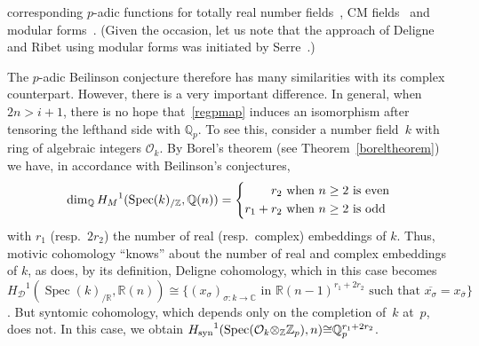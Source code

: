\documentclass{amsart}
\begin{document}
corresponding {$p$-adic{\futurelet{}}} functions for totally real number fields~\cite{Bar78,Cas-Nog79,Del-Rib},
CM fields~\cite{Kat76,Kat78} and modular forms~\cite{MTT86}.
(Given the occasion, let us note that the approach of Deligne and Ribet using modular forms was
initiated by Serre~\cite{Ser73}.)

The $p$-adic Beilinson conjecture therefore has many
similarities with its complex counterpart. However, there is a very
important difference. In general, when $  2n>i+1 $, there is no hope that~\eqref{regpmap}
induces an isomorphism after tensoring the lefthand side with ${\mathbb Q}_p$. 
To see this, consider a number field~$k$ with ring of algebraic integers $ {{\mathcal O}_k} $.
By Borel's theorem (see Theorem~\ref{boreltheorem}) we have,
in accordance with Beilinson's conjectures,
\begin{equation*}
  \dim_{\mathbb Q} {H_M}^1({\operatorname{Spec}}(k)_{/{\mathbb Z}},{\mathbb Q}(n))=
\left\{ 
\begin{aligned}
      r_2 & \text{ when $ n \ge 2 $ is even }
\\
r_1 + r_2 & \text{ when $ n \ge 2 $ is odd }
\end{aligned}
 \right.
\end{equation*}
with $r_1$ (resp.\ $ 2 r_2 $) the number of real (resp.\ complex)
embeddings of $k$. Thus, motivic cohomology ``knows'' about the number
of real and complex embeddings of $k$, as does, by its definition, 
Deligne cohomology, which in this case becomes
$ {H_{\mathcal D}}^1({\operatorname{Spec}}(k)_{/{\mathbb R}},{\mathbb R}(n)) {\cong} \{ (x_{\sigma})_{{\sigma}: k \to {\mathbb C}} \text{ in } {\mathbb R}(n-1)^{r_1+2r_2} \text{ such that } \overline{x_{\sigma}} = x_{\overline {\sigma}}\} $.
But syntomic cohomology, which depends only on the completion of~$k$  at~$p$, does
not.  In this case, we obtain
$ {H_{\textup{syn}}}^1({\operatorname{Spec}}({{\mathcal O}_k}{\otimes}_{\mathbb Z}{\mathbb Z_p}),n) {\cong} {\mathbb Q}_p^{r_1+2r_2} $.
\end{document}
